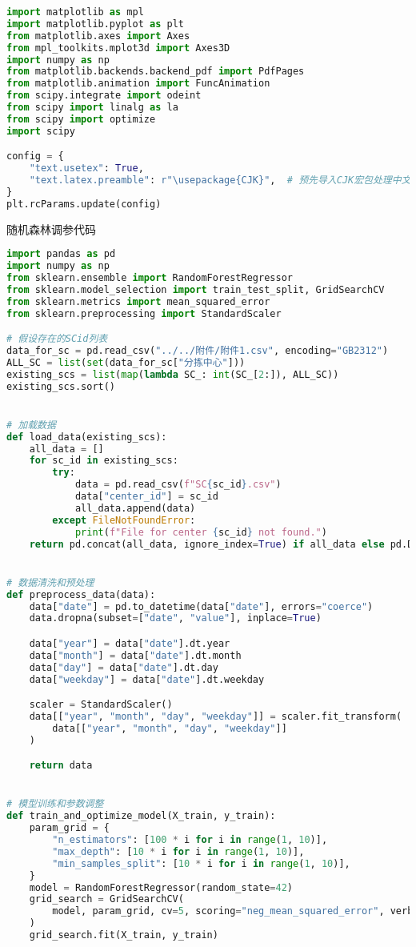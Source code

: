 \documentclass[UTF8,a4paper,10 pt]{article}%
\begin{document}
\begin{lstlisting}[language=python]
import matplotlib as mpl
import matplotlib.pyplot as plt
from matplotlib.axes import Axes
from mpl_toolkits.mplot3d import Axes3D
import numpy as np
from matplotlib.backends.backend_pdf import PdfPages
from matplotlib.animation import FuncAnimation
from scipy.integrate import odeint
from scipy import linalg as la
from scipy import optimize
import scipy

config = {
    "text.usetex": True,
    "text.latex.preamble": r"\usepackage{CJK}",  # 预先导入CJK宏包处理中文
}
plt.rcParams.update(config)
\end{lstlisting}

随机森林调参代码
\begin{lstlisting}[language=python]
import pandas as pd
import numpy as np
from sklearn.ensemble import RandomForestRegressor
from sklearn.model_selection import train_test_split, GridSearchCV
from sklearn.metrics import mean_squared_error
from sklearn.preprocessing import StandardScaler

# 假设存在的SCid列表
data_for_sc = pd.read_csv("../../附件/附件1.csv", encoding="GB2312")
ALL_SC = list(set(data_for_sc["分拣中心"]))
existing_scs = list(map(lambda SC_: int(SC_[2:]), ALL_SC))
existing_scs.sort()


# 加载数据
def load_data(existing_scs):
    all_data = []
    for sc_id in existing_scs:
        try:
            data = pd.read_csv(f"SC{sc_id}.csv")
            data["center_id"] = sc_id
            all_data.append(data)
        except FileNotFoundError:
            print(f"File for center {sc_id} not found.")
    return pd.concat(all_data, ignore_index=True) if all_data else pd.DataFrame()


# 数据清洗和预处理
def preprocess_data(data):
    data["date"] = pd.to_datetime(data["date"], errors="coerce")
    data.dropna(subset=["date", "value"], inplace=True)

    data["year"] = data["date"].dt.year
    data["month"] = data["date"].dt.month
    data["day"] = data["date"].dt.day
    data["weekday"] = data["date"].dt.weekday

    scaler = StandardScaler()
    data[["year", "month", "day", "weekday"]] = scaler.fit_transform(
        data[["year", "month", "day", "weekday"]]
    )

    return data


# 模型训练和参数调整
def train_and_optimize_model(X_train, y_train):
    param_grid = {
        "n_estimators": [100 * i for i in range(1, 10)],
        "max_depth": [10 * i for i in range(1, 10)],
        "min_samples_split": [10 * i for i in range(1, 10)],
    }
    model = RandomForestRegressor(random_state=42)
    grid_search = GridSearchCV(
        model, param_grid, cv=5, scoring="neg_mean_squared_error", verbose=2
    )
    grid_search.fit(X_train, y_train)


\end{lstlisting}
\end{document}

